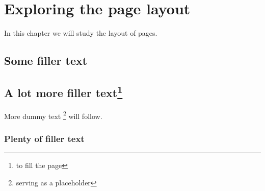 \documentclass[a4paper,12pt]{book}
\begin{document}
\chapter{Exploring the page layout}
In this chapter we will study the layout of pages.
\section{Some filler text}
\blindtext
\section{A lot more filler text\protect\footnote{to fill the page}}
More dummy text \footnote{serving as a placeholder} will follow.
\subsection{Plenty of filler text}
\enlargethispage{\baselineskip}
\blindtext[10]
\end{document}
